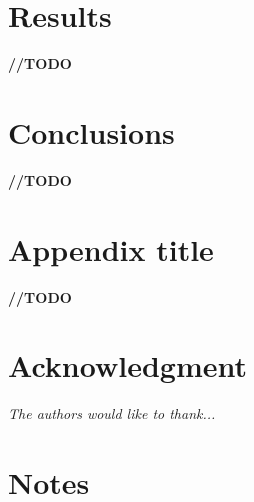 \documentclass[journal,onecolumn]{IEEEtran}
\begin{document}
%
%
%
\section{Results}

\textbf{//TODO}


%
%
%
\section{Conclusions}

\textbf{//TODO}


\appendices
\section{Appendix title}

\textbf{//TODO}


%
%
%
\section*{Acknowledgment}

\textit{The authors would like to thank...}


%
%
%
\section*{Notes}
\end{document}
